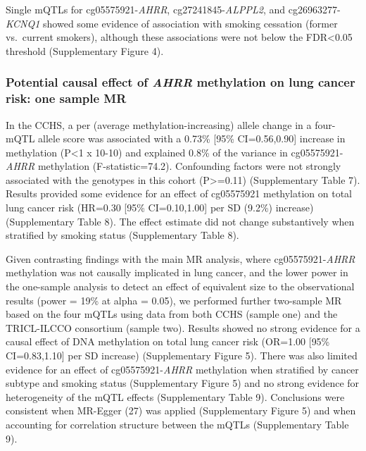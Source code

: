 \documentclass[11pt,oneside]{bristolthesis}
\begin{document}
Single mQTLs for cg05575921-\emph{AHRR}, cg27241845-\emph{ALPPL2}, and cg26963277-\emph{KCNQ1} showed some evidence of association with smoking cessation (former vs.~current smokers), although these associations were not below the FDR\textless0.05 threshold (Supplementary Figure 4).

\hypertarget{potential-causal-effect-of-ahrr-methylation-on-lung-cancer-risk-one-sample-mr}{%
\subsubsection{\texorpdfstring{Potential causal effect of \emph{AHRR} methylation on lung cancer risk: one sample MR}{Potential causal effect of AHRR methylation on lung cancer risk: one sample MR}}\label{potential-causal-effect-of-ahrr-methylation-on-lung-cancer-risk-one-sample-mr}}

In the CCHS, a per (average methylation-increasing) allele change in a four-mQTL allele score was associated with a 0.73\% {[}95\% CI=0.56,0.90{]} increase in methylation (P\textless1 x 10-10) and explained 0.8\% of the variance in cg05575921-\emph{AHRR} methylation (F-statistic=74.2). Confounding factors were not strongly associated with the genotypes in this cohort (P\textgreater=0.11) (Supplementary Table 7). Results provided some evidence for an effect of cg05575921 methylation on total lung cancer risk (HR=0.30 {[}95\% CI=0.10,1.00{]} per SD (9.2\%) increase) (Supplementary Table 8). The effect estimate did not change substantively when stratified by smoking status (Supplementary Table 8).

Given contrasting findings with the main MR analysis, where cg05575921-\emph{AHRR} methylation was not causally implicated in lung cancer, and the lower power in the one-sample analysis to detect an effect of equivalent size to the observational results (power = 19\% at alpha = 0.05), we performed further two-sample MR based on the four mQTLs using data from both CCHS (sample one) and the TRICL-ILCCO consortium (sample two). Results showed no strong evidence for a causal effect of DNA methylation on total lung cancer risk (OR=1.00 {[}95\% CI=0.83,1.10{]} per SD increase) (Supplementary Figure 5). There was also limited evidence for an effect of cg05575921-\emph{AHRR} methylation when stratified by cancer subtype and smoking status (Supplementary Figure 5) and no strong evidence for heterogeneity of the mQTL effects (Supplementary Table 9). Conclusions were consistent when MR-Egger (27) was applied (Supplementary Figure 5) and when accounting for correlation structure between the mQTLs (Supplementary Table 9).
\end{document}
